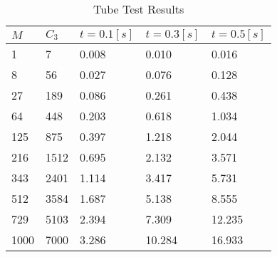 \begin{table}[H]
    \centering
    \begin{tabular}{lllll}
      \toprule
      $M$ & $C_3$ & $t=0.1 [s]$ & $t=0.3 [s]$ & $t=0.5 [s]$ \\ \midrule
      1 & 7 & 0.008 & 0.010 & 0.016  \\
      8 & 56 & 0.027 & 0.076 & 0.128   \\
      27 & 189 & 0.086 & 0.261 & 0.438   \\
      64 & 448 & 0.203 & 0.618 & 1.034   \\
      125 & 875 & 0.397 & 1.218 & 2.044   \\
      216 & 1512 & 0.695 & 2.132 & 3.571   \\
      343 & 2401 & 1.114 & 3.417 & 5.731   \\
      512 & 3584 & 1.687 & 5.138 & 8.555   \\
      729 & 5103 & 2.394 & 7.309 & 12.235   \\
      1000 & 7000 & 3.286 & 10.284 & 16.933  \\
      \bottomrule
    \end{tabular}

    \caption[Tube Test Results]{Tube Test Results}
    \label{tab:tube}
\end{table}
